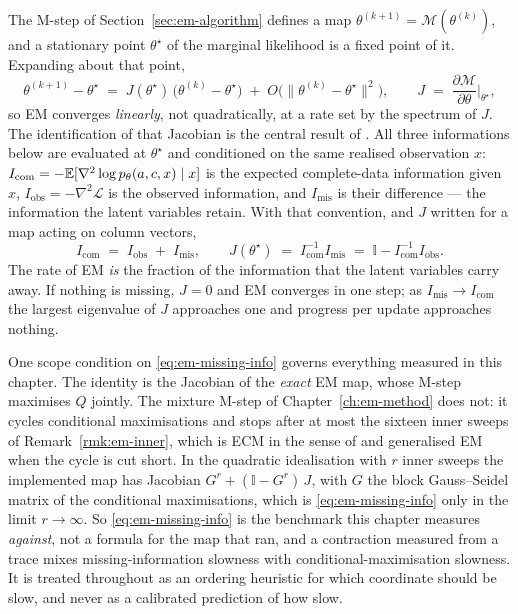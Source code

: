 The M-step of Section~\ref{sec:em-algorithm} defines a map
$\theta^{(k+1)} = \mathcal M(\theta^{(k)})$, and a stationary point $\theta^\star$
of the marginal likelihood is a fixed point of it. Expanding about that point,
\begin{equation}
  \theta^{(k+1)} - \theta^\star
  \;=\; J(\theta^\star)\,\big(\theta^{(k)} - \theta^\star\big)
     \;+\; O\big(\|\theta^{(k)} - \theta^\star\|^2\big),
  \qquad
  J \;=\; \frac{\partial \mathcal M}{\partial \theta}\bigg|_{\theta^\star},
  \label{eq:em-fixedpoint}
\end{equation}
so EM converges \emph{linearly}, not quadratically, at a rate set by the
spectrum of $J$. The identification of that Jacobian is the central result of
\citet{dempster1977maximum}. All three informations below are evaluated at
$\theta^\star$ and conditioned on the same realised observation $x$:
$I_{\mathrm{com}} = -\mathbb{E}[\nabla^2 \log p_\theta(a,c,x) \mid x]$ is the
expected complete-data information given $x$,
$I_{\mathrm{obs}} = -\nabla^2 \mathcal L$ is the observed information, and
$I_{\mathrm{mis}}$ is their difference --- the information the latent
variables retain. With that convention, and $J$ written for a map acting on
column vectors,
\begin{equation}
  I_{\mathrm{com}} \;=\; I_{\mathrm{obs}} \;+\; I_{\mathrm{mis}},
  \qquad
  J(\theta^\star)
  \;=\; I_{\mathrm{com}}^{-1} I_{\mathrm{mis}}
  \;=\; \mathbb{I} - I_{\mathrm{com}}^{-1} I_{\mathrm{obs}} .
  \label{eq:em-missing-info}
\end{equation}
The rate of EM \emph{is} the fraction of the information that the latent
variables carry away. If nothing is missing, $J = 0$ and EM converges in one
step; as $I_{\mathrm{mis}} \to I_{\mathrm{com}}$ the largest eigenvalue of $J$
approaches one and progress per update approaches nothing.

One scope condition on \eqref{eq:em-missing-info} governs everything measured
in this chapter. The identity is the Jacobian of the \emph{exact} EM map,
whose M-step maximises $Q$ jointly. The mixture M-step of
Chapter~\ref{ch:em-method} does not: it cycles conditional maximisations and
stops after at most the sixteen inner sweeps of
Remark~\ref{rmk:em-inner}, which is ECM in the sense of
\citet{meng1993maximum} and generalised EM when the cycle is cut short. In the
quadratic idealisation with $r$ inner sweeps the implemented map has Jacobian
$G^{r} + (\mathbb{I} - G^{r})\,J$, with $G$ the block Gauss--Seidel matrix of
the conditional maximisations, which is \eqref{eq:em-missing-info} only in the
limit $r \to \infty$. So \eqref{eq:em-missing-info} is the benchmark this
chapter measures \emph{against}, not a formula for the map that ran, and a
contraction measured from a trace mixes missing-information slowness with
conditional-maximisation slowness. It is treated throughout as an ordering
heuristic for which coordinate should be slow, and never as a calibrated
prediction of how slow.


